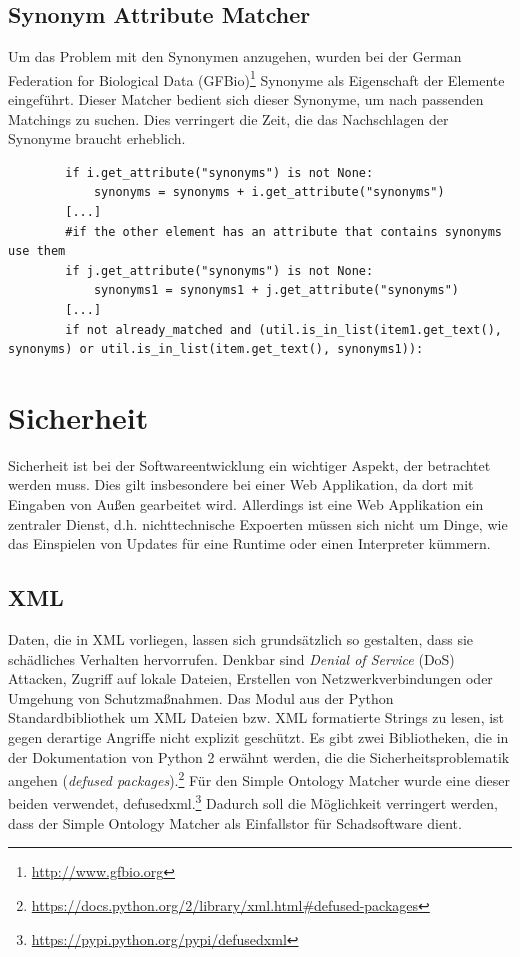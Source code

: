 		\subsection{Synonym Attribute Matcher}
		Um das Problem mit den Synonymen anzugehen, wurden bei der German Federation
		for Biological Data (GFBio)\footnote{\url{http://www.gfbio.org}} Synonyme als
		Eigenschaft der Elemente eingeführt. Dieser Matcher bedient sich dieser
		Synonyme, um nach passenden Matchings zu suchen. Dies verringert die Zeit, die
		das Nachschlagen der Synonyme braucht erheblich.
		\begin{lstlisting}
		if i.get_attribute("synonyms") is not None:
            synonyms = synonyms + i.get_attribute("synonyms")
        [...]
        #if the other element has an attribute that contains synonyms use them
        if j.get_attribute("synonyms") is not None:
            synonyms1 = synonyms1 + j.get_attribute("synonyms")
        [...]
        if not already_matched and (util.is_in_list(item1.get_text(), synonyms) or util.is_in_list(item.get_text(), synonyms1)):
		\end{lstlisting}
		
		\section{Sicherheit}
		Sicherheit ist bei der Softwareentwicklung ein wichtiger Aspekt, der
		betrachtet werden muss. Dies gilt insbesondere bei einer Web Applikation, da
		dort mit Eingaben von Außen gearbeitet wird. Allerdings ist eine Web
		Applikation ein zentraler Dienst, d.h. nichttechnische Expoerten müssen sich
		nicht um Dinge, wie das Einspielen von Updates für eine Runtime oder einen
		Interpreter kümmern.
		
		\subsection{XML}
		Daten, die in XML vorliegen, lassen sich grundsätzlich so gestalten, dass sie
		schädliches Verhalten hervorrufen. Denkbar sind
		\textit{Denial of Service} (DoS) Attacken, Zugriff auf lokale Dateien,
		Erstellen von Netzwerkverbindungen oder Umgehung von
		Schutzmaßnahmen.\cite{defusedxml}
		Das Modul aus der Python Standardbibliothek um XML Dateien bzw. XML
		formatierte Strings zu lesen, ist gegen derartige Angriffe nicht explizit
		geschützt. Es gibt zwei Bibliotheken, die in der Dokumentation von Python 2
		erwähnt werden, die die Sicherheitsproblematik angehen (\textit{defused
		packages}).\footnote{\url{https://docs.python.org/2/library/xml.html#defused-packages}}
		Für den Simple Ontology Matcher wurde eine dieser beiden verwendet, defusedxml.\footnote{\url{https://pypi.python.org/pypi/defusedxml}} Dadurch
		soll die Möglichkeit verringert werden, dass der Simple Ontology Matcher als
		Einfallstor für Schadsoftware dient.
		
